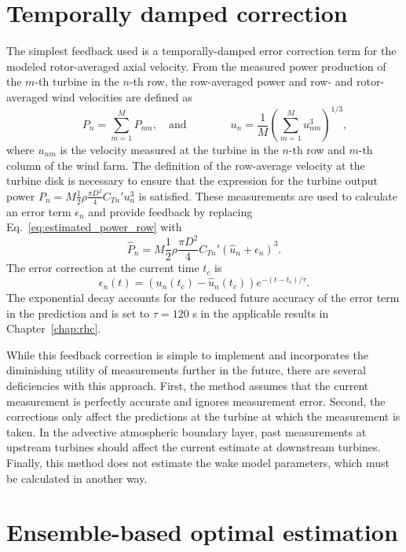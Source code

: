 \section{Temporally damped correction}
\label{sec:estimation-damped}
The simplest feedback used is a temporally-damped error correction term for the modeled rotor-averaged axial velocity. From the measured power production of the $m$-th turbine in the $n$-th row, the row-averaged power and row- and rotor-averaged wind velocities are defined as
\begin{equation}
\qquad P_n = \sum_{m=1}^M P_{nm}, \quad \text{and} \qquad \qquad u_n = \frac{1}{M}\left(   \sum_{m=1}^M u_{nm}^3  \right)^{1/3},
\end{equation}
where $u_{nm}$  is the velocity measured at the turbine in the $n$-th row and $m$-th column of the wind farm. The definition of the row-average velocity at the turbine disk is necessary to ensure that  the expression for the turbine output power $P_n = M \frac{1}{2} \rho \frac{\pi D^2}{4} C_{Tn}' u_{n}^3$ is satisfied. These measurements are used to calculate an error term $\epsilon_n$ and provide feedback by replacing Eq.~\eqref{eq:estimated_power_row} with
\begin{equation}
\hat{P}_n = M \frac{1}{2}\rho \frac{\pi D^2}{4} C_{Tn}' (\hat{u}_n + \epsilon_n)^3.
\end{equation}
The error correction at the current time $t_c$ is 
\begin{equation}
\epsilon_n(t) = \left(u_n(t_c) -  \hat{u}_n (t_c) \right) e^{-(t-t_c)/\tau}.
\end{equation}
The exponential decay accounts for the reduced  future accuracy of the error term in the prediction and is set to $\tau = 120$ s in the applicable results in Chapter~\ref{chap:rhc}.

While this feedback correction is simple to implement and incorporates the diminishing utility of  measurements further in the future, there are several deficiencies with this approach. First, the method assumes that the current measurement is perfectly accurate and ignores measurement error. Second, the corrections only affect the predictions at the turbine at which the measurement is taken. In the advective atmospheric boundary layer, past measurements at upstream turbines should affect the current estimate at downstream turbines. Finally, this method does not estimate the wake model parameters, which must be calculated in another way.

\section{Ensemble-based optimal estimation}
\label{sec:estimation-ensemble}

